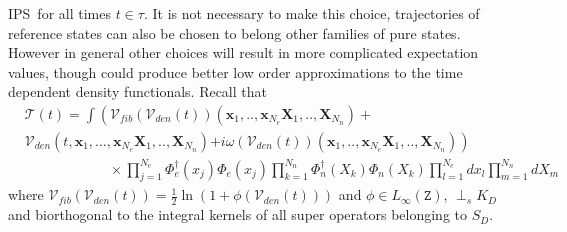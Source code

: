 \documentclass[aps,preprint]{revtex4}%
\begin{document}
IPS\ for all times $t\in\tau$. It is not necessary to make this choice,
trajectories of reference states can also be chosen to belong other families
of pure states. However in general other choices will result in more
complicated expectation values, though could produce better low order
approximations to the time dependent density functionals. Recall that
\begin{align}
&  \mathcal{T}\left(  t\right)  \mathcal{=}\int\left(  \mathcal{V}%
_{fib}\left(  \mathcal{V}_{den}\left(  t\right)  \right)  (\mathbf{x}%
_{1},..,\mathbf{x}_{N_{e}}\mathbf{X}_{1},..,\mathbf{X}_{N_{n}})+\right.
\nonumber\\
&  \mathcal{V}_{den}\left(  t,\mathbf{x}_{1},\ldots,\mathbf{x}_{N_{e}%
}\mathbf{X}_{1},..,\mathbf{X}_{N_{n}}\right)  \left.  +i\mathcal{\omega
}\left(  \mathcal{V}_{den}\left(  t\right)  \right)  (\mathbf{x}%
_{1},..,\mathbf{x}_{N_{e}}\mathbf{X}_{1},..,\mathbf{X}_{N_{n}})\right)
\nonumber\\
&  \qquad\qquad\qquad\times\prod\limits_{j=1}^{N_{e}}\Phi_{e}^{\dagger}%
(x_{j})\Phi_{e}(x_{j})\prod\limits_{k=1}^{N_{n}}\Phi_{n}^{\dagger}(X_{k}%
)\Phi_{n}(X_{k})\prod\limits_{l=1}^{N_{e}}dx_{l}\prod_{m=1}^{N_{n}}dX_{m}%
\end{align}
where $\mathcal{V}_{fib}\left(  \mathcal{V}_{den}\left(  t\right)  \right)
=\frac{1}{2}\ln\left(  1+\phi\left(  \mathcal{V}_{den}\left(  t\right)
\right)  \right)  $ and $\phi\in L_{\infty}\left(  \mathtt{Z}\right)  $,
$\perp_{s}K_{D}$ and biorthogonal to the integral kernels of all super
operators belonging to $S_{D}$.
\end{document}
